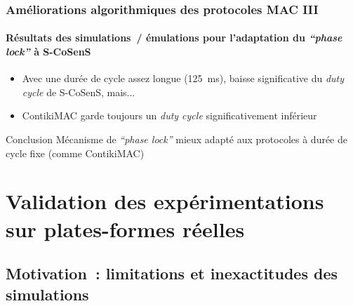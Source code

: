\documentclass[10pt,c]{beamer}
\newcommand{\lang}[1]{\textit{#1}}
\begin{document}
\begin{frame}[label=ameliorAlgo3]
\frametitle{Améliorations algorithmiques des protocoles MAC III}
\framesubtitle{Résultats des simulations~/ émulations pour l'adaptation
                du \lang{``phase lock''} à S-CoSenS}

\vspace{-0.25cm}
{\small
\begin{itemize}
\item Avec une durée de cycle assez longue (125~ms),
      baisse significative du \lang{duty cycle} de S-CoSenS, mais...
\item ContikiMAC garde toujours un \lang{duty cycle} significativement
      inférieur
\end{itemize}
}

\vspace{-0.5cm}

\vspace{-0.25cm}
\begin{exampleblock}{Conclusion}
Mécanisme de \lang{``phase lock''} mieux adapté aux protocoles à durée
de cycle fixe (comme ContikiMAC)
\end{exampleblock}

\end{frame}


\section[Validation sur plates-formes réelles]
        {Validation des expérimentations sur plates-formes réelles}


\subsection{Motivation~: limitations et inexactitudes des simulations}
\end{document}
